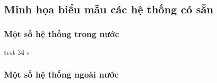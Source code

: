 \subsection{Minh họa biểu mẫu các hệ thống có sẵn}
\setcounter{subsection}{3}
\setcounter{figure}{0}

\subsubsection{Một số hệ thống trong nước}
test 34
s
\subsubsection{Một số hệ thống ngoài nước}
